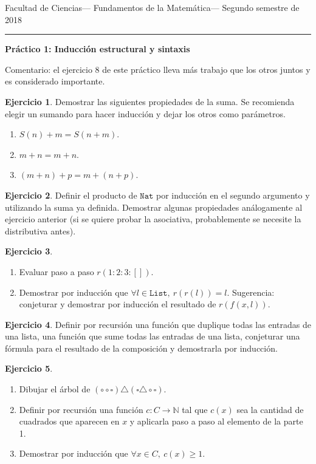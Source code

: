 \documentclass[a4paper,12pt]{book}
\newcommand{\N}{\mathbb{N}}
\theoremstyle{definition}
\newtheorem{ejercicio}{Ejercicio}
\begin{document}
	
	\noindent
	\centerline{\sc
		Facultad de Ciencias\hfill---\hfill
		Fundamentos de la Matemática\hfill---\hfill
		Segundo semestre de 2018}\smallbreak\hrule
	
	\bigbreak
	\centerline{\Large\textbf{Práctico 1: Inducción estructural y sintaxis}}
	\bigbreak
	
	Comentario: el ejercicio 8 de este práctico lleva más trabajo que los otros juntos y es considerado importante.
	
	\begin{ejercicio}
		Demostrar las siguientes propiedades de la suma. Se recomienda elegir un sumando para hacer inducción y dejar los otros como parámetros.
		\begin{enumerate}\parskip-.5ex
			\item $S(n)+m = S(n+m)$.
			\item $m+n = m+n$.
			\item $(m+n)+p = m+(n+p)$.
		\end{enumerate}
		
	\end{ejercicio}
	\begin{ejercicio}
		Definir el producto de $\mathtt{Nat}$ por inducción en el segundo argumento y utilizando la suma ya definida. Demostrar algunas propiedades análogamente al ejercicio anterior (si se quiere probar la asociativa, probablemente se necesite la distributiva antes).
	\end{ejercicio}
	\begin{ejercicio}
		\begin{enumerate}\parskip-.5ex
			\item Evaluar paso a paso $r(1:2:3:[])$.
			\item Demostrar por inducción que $\forall l\in\mathtt{List},~r(r(l))=l$. Sugerencia: conjeturar y demostrar por inducción el resultado de $r(f(x,l))$.
		\end{enumerate}
	\end{ejercicio}
	\begin{ejercicio}
		Definir por recursión  una función que duplique todas las entradas de una lista, una función que sume todas las entradas de una lista, conjeturar una fórmula para el resultado de la composición y demostrarla por inducción.
	\end{ejercicio}
	\begin{ejercicio}
		\begin{enumerate}\parskip-.5ex
			\item Dibujar el árbol de $(\circ\circ\square)\triangle(\square\triangle\circ\square)$.
			\item Definir por recursión una función $c:C\to\N$ tal que $c(x)$ sea la cantidad de cuadrados que aparecen en $x$ y aplicarla paso a paso al elemento de la parte 1.
			\item Demostrar por inducción que $\forall x\in C,~c(x)\geq 1$.
		\end{enumerate}
	\end{ejercicio}
\end{document}
